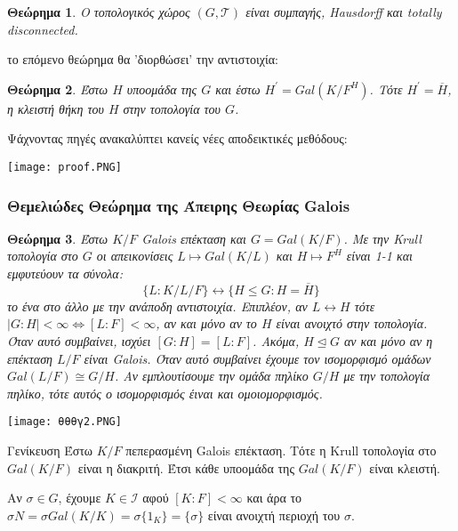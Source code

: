 \documentclass{beamer}
\newcommand {\tl}{\textlatin}
\newtheorem{thrm}{Θεώρημα}
\begin{document}
\begin{frame}
\begin{thrm}
    Ο τοπολογικός χώρος $(G,\mathcal{T})$ είναι συμπαγής, \tl{Hausdorff} και \tl{totally disconnected}.
\end{thrm}
    \pause
    το επόμενο θεώρημα θα 'διορθώσει' την αντιστοιχία:
    \begin{thrm}
    Έστω $H$ υποομάδα της $G$ και έστω $H^{\prime} = Gal(K/F^H)$. Τότε $H^{\prime} = \overline{H}$, η κλειστή θήκη του $H$ στην τοπολογία του $G$.
    \end{thrm}
\end{frame}
\begin{frame}
Ψάχνοντας πηγές ανακαλύπτει κανείς νέες αποδεικτικές μεθόδους:
$ $\newline

    \texttt{[image: proof.PNG]}
\end{frame}

\begin{frame}
    \frametitle{Θεμελιώδες Θεώρημα της Άπειρης Θεωρίας \tl{Galois}}
    \begin{thrm}
    Έστω $K/F$ \tl{Galois} επέκταση και $G=Gal(K/F)$. Με την \tl{Krull} τοπολογία στο $G$
οι απεικονίσεις $L \mapsto Gal(K/L)$ και $H \mapsto F^H$ είναι 1-1 και εμφυτεύουν τα σύνολα:
$$\{L : K/L/F \} \longleftrightarrow \{H \leq G: H = \overline H\}$$
το ένα στο άλλο με την ανάποδη αντιστοιχία. Επιπλέον, αν $L \longleftrightarrow H$ τότε $|G:H| < \infty \iff [L:F] < \infty$, αν και μόνο αν το $H$ είναι ανοιχτό στην τοπολογία. Όταν αυτό συμβαίνει, ισχύει $[G:H] = [L:F]$. Ακόμα, $H \unlhd G$ αν και μόνο αν η επέκταση $L/F$ είναι \tl{Galois}. Όταν αυτό συμβαίνει έχουμε τον ισομορφισμό ομάδων $Gal(L/F) \cong G/H$. Αν εμπλουτίσουμε την ομάδα πηλίκο $G/H$ με την τοπολογία πηλίκο, τότε αυτός ο ισομορφισμός έιναι και ομοιομορφισμός.

    \end{thrm}
\end{frame}

\begin{frame}
\texttt{[image: θθθγ2.PNG]}
    
\end{frame}

\begin{frame}
    \begin{block}{Γενίκευση}
    Έστω $K/F$ πεπερασμένη \tl{Galois} επέκταση. Τότε η \tl{Krull} τοπολογία στο $Gal(K/F)$ είναι η διακριτή. Έτσι κάθε υποομάδα της $Gal(K/F)$ είναι κλειστή.
    \end{block}
    \pause
    \begin{block}{}
    Aν $\sigma \in G$, έχουμε $K\in \mathcal I$ αφού $[K:F]<\infty$ και άρα το $\sigma N = \sigma Gal(K/K) = \sigma \{1_K\} = \{ \sigma\}$ είναι ανοιχτή περιοχή του $\sigma$.
    \end{block}
\end{frame}
\end{document}

